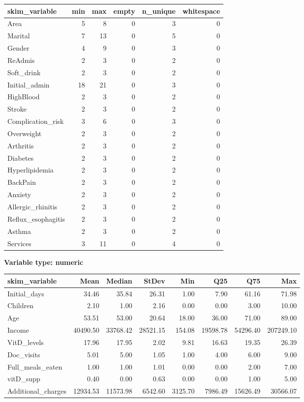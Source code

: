 \documentclass[
]{article}
\begin{document}
\begin{longtable}[]{@{}lrrrrr@{}}
\toprule
skim\_variable & min & max & empty & n\_unique & whitespace \\
\midrule
\endhead
Area & 5 & 8 & 0 & 3 & 0 \\
Marital & 7 & 13 & 0 & 5 & 0 \\
Gender & 4 & 9 & 0 & 3 & 0 \\
ReAdmis & 2 & 3 & 0 & 2 & 0 \\
Soft\_drink & 2 & 3 & 0 & 2 & 0 \\
Initial\_admin & 18 & 21 & 0 & 3 & 0 \\
HighBlood & 2 & 3 & 0 & 2 & 0 \\
Stroke & 2 & 3 & 0 & 2 & 0 \\
Complication\_risk & 3 & 6 & 0 & 3 & 0 \\
Overweight & 2 & 3 & 0 & 2 & 0 \\
Arthritis & 2 & 3 & 0 & 2 & 0 \\
Diabetes & 2 & 3 & 0 & 2 & 0 \\
Hyperlipidemia & 2 & 3 & 0 & 2 & 0 \\
BackPain & 2 & 3 & 0 & 2 & 0 \\
Anxiety & 2 & 3 & 0 & 2 & 0 \\
Allergic\_rhinitis & 2 & 3 & 0 & 2 & 0 \\
Reflux\_esophagitis & 2 & 3 & 0 & 2 & 0 \\
Asthma & 2 & 3 & 0 & 2 & 0 \\
Services & 3 & 11 & 0 & 4 & 0 \\
\bottomrule
\end{longtable}

\textbf{Variable type: numeric}

\begin{longtable}[]{@{}lrrrrrrr@{}}
\toprule
skim\_variable & Mean & Median & StDev & Min & Q25 & Q75 & Max \\
\midrule
\endhead
Initial\_days & 34.46 & 35.84 & 26.31 & 1.00 & 7.90 & 61.16 & 71.98 \\
Children & 2.10 & 1.00 & 2.16 & 0.00 & 0.00 & 3.00 & 10.00 \\
Age & 53.51 & 53.00 & 20.64 & 18.00 & 36.00 & 71.00 & 89.00 \\
Income & 40490.50 & 33768.42 & 28521.15 & 154.08 & 19598.78 & 54296.40 &
207249.10 \\
VitD\_levels & 17.96 & 17.95 & 2.02 & 9.81 & 16.63 & 19.35 & 26.39 \\
Doc\_visits & 5.01 & 5.00 & 1.05 & 1.00 & 4.00 & 6.00 & 9.00 \\
Full\_meals\_eaten & 1.00 & 1.00 & 1.01 & 0.00 & 0.00 & 2.00 & 7.00 \\
vitD\_supp & 0.40 & 0.00 & 0.63 & 0.00 & 0.00 & 1.00 & 5.00 \\
Additional\_charges & 12934.53 & 11573.98 & 6542.60 & 3125.70 & 7986.49
& 15626.49 & 30566.07 \\
\bottomrule
\end{longtable}
\end{document}
